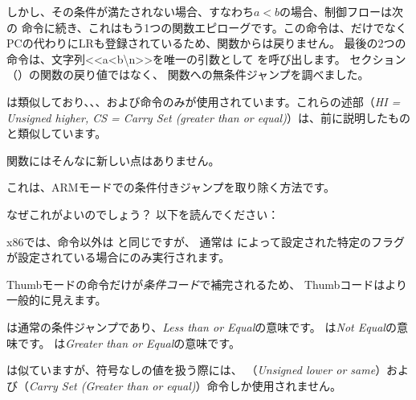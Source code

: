 
しかし、その条件が満たされない場合、すなわち$a<b$の場合、制御フローは次の
命令に続き、これはもう1つの関数エピローグです。この命令は、だけでなく\ac{PC}の代わりに\ac{LR}も登録されているため、関数からは戻りません。
最後の2つの命令は、文字列<<a<b\textbackslash{}n>>を唯一の引数として \printf を呼び出します。  
\printf セクション（）の関数の戻り値ではなく、 \printf 関数への無条件ジャンプを調べました。

は類似しており、、、および命令のみが使用されています。これらの述部（\emph{HI = Unsigned higher, CS = Carry Set (greater than or equal)}）は、前に説明したものと類似しています。

\main 関数にはそんなに新しい点はありません。



これは、ARMモードでの条件付きジャンプを取り除く方法です。

なぜこれがよいのでしょう？ 以下を読んでください：


x86では、命令以外は \MOV と同じですが、
通常は \CMP によって設定された特定のフラグが設定されている場合にのみ実行されます。

\mysubparagraph{\OptimizingKeilVI (\ThumbMode)}




Thumbモードの命令だけが\emph{条件コード}で補完されるため、
Thumbコードはより一般的に見えます。

は通常の条件ジャンプであり、\emph{Less than or Equal}の意味です。 
は\emph{Not Equal}の意味です。
は\emph{Greater than or Equal}の意味です。

は似ていますが、符号なしの値を扱う際には、
（\emph{Unsigned lower or same}）および（\emph{Carry Set (Greater than or equal)}）命令しか使用されません。
